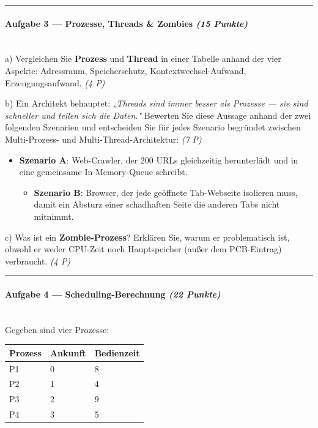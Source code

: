 \documentclass[11pt, a4paper]{article}
\begin{document}
\noindent\textcolor{rulegray}{\rule{\linewidth}{0.4pt}}


\paragraph{Aufgabe 3 — Prozesse, Threads \& Zombies \textit{(15 Punkte)}}\mbox{}\\[2pt]

a) Vergleichen Sie \textbf{Prozess} und \textbf{Thread} in einer Tabelle anhand der vier Aspekte: Adressraum, Speicherschutz, Kontextwechsel-Aufwand, Erzeugungsaufwand. \textit{(4 P)}


b) Ein Architekt behauptet: \textit{„Threads sind immer besser als Prozesse — sie sind schneller und teilen sich die Daten."} Bewerten Sie diese Aussage anhand der zwei folgenden Szenarien und entscheiden Sie für jedes Szenario begründet zwischen Multi-Prozess- und Multi-Thread-Architektur: \textit{(7 P)}


\begin{itemize}
  \item \textbf{Szenario A}: Web-Crawler, der 200 URLs gleichzeitig herunterlädt und in eine gemeinsame In-Memory-Queue schreibt.
\begin{itemize}
  \item \textbf{Szenario B}: Browser, der jede geöffnete Tab-Webseite isolieren muss, damit ein Absturz einer schadhaften Seite die anderen Tabs nicht mitnimmt.
\end{itemize}
\end{itemize}

c) Was ist ein \textbf{Zombie-Prozess}? Erklären Sie, warum er problematisch ist, obwohl er weder CPU-Zeit noch Hauptspeicher (außer dem PCB-Eintrag) verbraucht. \textit{(4 P)}



\noindent\textcolor{rulegray}{\rule{\linewidth}{0.4pt}}


\paragraph{Aufgabe 4 — Scheduling-Berechnung \textit{(22 Punkte)}}\mbox{}\\[2pt]

Gegeben sind vier Prozesse:



{\small
\begin{tabularx}{\linewidth}{XXX}
\hline
\rowcolor{tableheadbg}
{\color{white}\textbf{Prozess}} & {\color{white}\textbf{Ankunft}} & {\color{white}\textbf{Bedienzeit}} \\[2pt]
\hline
\endhead
\hline
\endfoot
P1 & 0 & 8 \\
P2 & 1 & 4 \\
P3 & 2 & 9 \\
P4 & 3 & 5 \\
\end{tabularx}
}
\end{document}
